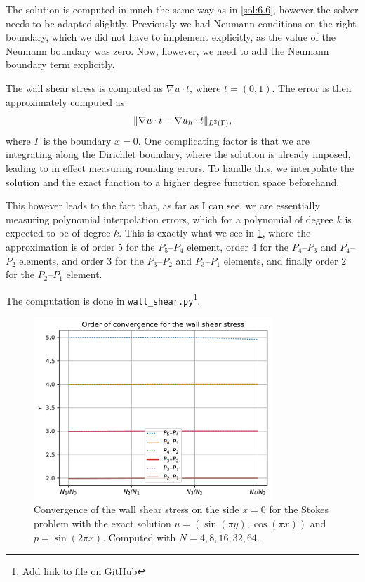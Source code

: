 \begin{solution}{6.7}
    The solution is computed in much the same way as in \cref{sol:6.6}, however the solver needs to be adapted slightly.
    Previously we had Neumann conditions on the right boundary, which we did not have to implement explicitly, as the value of the Neumann boundary was zero.
    Now, however, we need to add the Neumann boundary term explicitly.

    The wall shear stress is computed as $\nabla u \cdot t$, where $t = (0, 1)$.
    The error is then approximately computed as
    \begin{equation*}
        \lVert\nabla u \cdot t - \nabla u_h \cdot t\rVert_{L^2(\Gamma)},
    \end{equation*}
    where $\Gamma$ is the boundary $x = 0$.
    One complicating factor is that we are integrating along the Dirichlet boundary, where the solution is already imposed, leading to in effect measuring rounding errors.
    To handle this, we interpolate the solution and the exact function to a higher degree function space beforehand.

    This however leads to the fact that, as far as I can see, we are essentially measuring polynomial interpolation errors, which for a polynomial of degree $k$ is expected to be of degree $k$.
    This is exactly what we see in \cref{fig:wall_shear_stress}, where the approximation is of order 5 for the $P_5$--$P_4$ element, order 4 for the $P_4$--$P_3$ and $P_4$--$P_2$ elements, and order 3 for the $P_3$--$P_2$ and $P_3$--$P_1$ elements, and finally order 2 for the $P_2$--$P_1$ element.

    The computation is done in \texttt{wall\_shear.py}\footnote{Add link to file on GitHub}.

    \begin{figure}[htbp]
        \centering
        \includegraphics[width=0.8\textwidth]{wall_shear.pdf}
        \caption{Convergence of the wall shear stress on the side $x = 0$ for the Stokes problem with the exact solution $u = (\sin(\pi y), \cos(\pi x))$ and $p = \sin(2 \pi x)$. Computed with $N = 4, 8, 16, 32, 64$.\label{fig:wall_shear_stress}}
    \end{figure}
\end{solution}